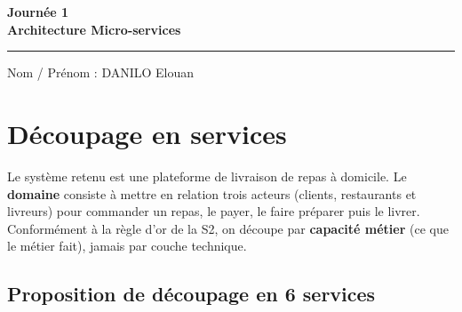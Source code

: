 \documentclass[11pt,a4paper]{article}
\begin{document}
\thispagestyle{empty}
\begin{center}
  {\LARGE\bfseries Journée 1}\\[4pt]
  {\large\bfseries Architecture Micro-services}\\[6pt]
\end{center}

\vspace{4pt}
\hrule
\vspace{8pt}

Nom / Prénom : DANILO Elouan

\vspace{6pt}

\section{Découpage en services}

Le système retenu est une plateforme de livraison de repas à domicile. Le \textbf{domaine} consiste à mettre en relation trois acteurs (clients, restaurants et livreurs) pour commander un repas, le payer, le faire préparer puis le livrer. Conformément à la règle d'or de la S2, on découpe par \textbf{capacité métier} (ce que le métier fait), jamais par couche technique.

\subsection{Proposition de découpage en 6 services}
\end{document}

